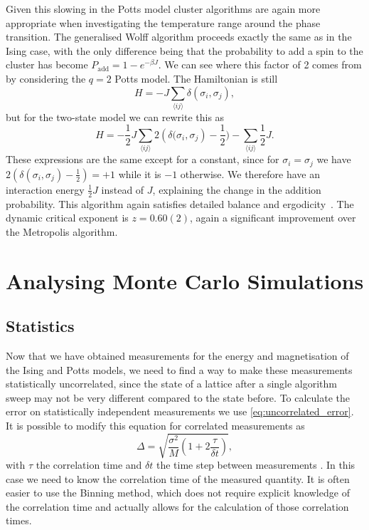 \documentclass[11pt, a4paper]{report} %
\begin{document}
Given this slowing in the Potts model cluster algorithms are again more appropriate when investigating the temperature range around the phase transition.
The generalised Wolff algorithm proceeds exactly the same as in the Ising case, with the only difference being that the probability to add a spin to the cluster has become \(P_{\mathrm{add}} = 1 - e^{-\beta J}\).
We can see where this factor of 2 comes from by considering the \(q=2\) Potts model.
The Hamiltonian is still
\begin{equation}
	H = -J\sum_{\langle i j \rangle} \delta(\sigma_i, \sigma_j),
\end{equation}
but for the two-state model we can rewrite this as
\begin{equation}
	H = -\frac{1}{2} J \sum_{\langle i j \rangle} 2 \left(\delta(\sigma_i, \sigma_j\right) - \frac{1}{2}) - \sum_{\langle i j \rangle} \frac{1}{2}J.
\end{equation}
These expressions are the same except for a constant, since for \(\sigma_i = \sigma_j\) we have \(2 (\delta(\sigma_i, \sigma_j) - \frac{1}{2}) = +1\) while it is \(-1\) otherwise.
We therefore have an interaction energy \(\frac{1}{2}J\) instead of \(J\), explaining the change in the addition probability.
This algorithm again satisfies detailed balance and ergodicity~\cite{newman:1999}.
The dynamic critical exponent is \(z=0.60(2)\), again a significant improvement over the Metropolis algorithm.


\chapter{Analysing Monte Carlo Simulations}
\section{Statistics}\label{sec:statistics}
Now that we have obtained measurements for the energy and magnetisation of the Ising and Potts models, we need to find a way to make these measurements statistically uncorrelated, since the state of a lattice after a single algorithm sweep may not be very different compared to the state before.
To calculate the error on statistically independent measurements we use \cref{eq:uncorrelated_error}.
It is possible to modify this equation for correlated measurements as
\begin{equation}
	\Delta = \sqrt{\frac{\sigma^2}{M}\left(1+2\frac{\tau}{\delta t}\right)},
\end{equation}
with \(\tau\) the correlation time and \(\delta t\) the time step between measurements \cite{landau:2015}.
In this case we need to know the correlation time of the measured quantity.
It is often easier to use the Binning method, which does not require explicit knowledge of the correlation time and actually allows for the calculation of those correlation times.
\end{document}
